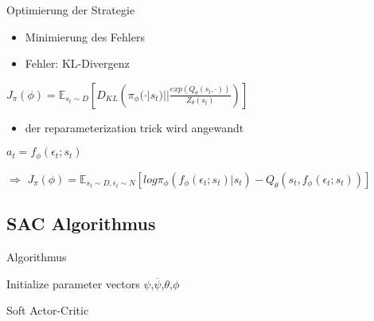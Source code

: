 \begin{frame}{Optimierung der Strategie}
\begin{itemize}
\item Minimierung des Fehlers
\item Fehler: KL-Divergenz
\end{itemize}
$J_{\pi}(\phi)=\mathbb{E}_{s_{t}\sim D}\left[D_{KL}\left(\pi_{\phi}(\cdot | s_{t})||\frac{exp(Q_{\theta}(s_{t},\cdot))}{Z_{\theta}(s_{t})}\right)\right]$
\begin{itemize}
\item der reparameterization trick wird angewandt
\end{itemize}
$a_{t}=f_{\phi}(\epsilon_{t};s_{t})$

$\Rightarrow$
$J_{\pi}(\phi)=\mathbb{E}_{s_{t}\sim D,\epsilon_{t}\sim N}\left[log\pi_{\phi}(f_{\phi}(\epsilon_{t};s_{t})|s_{t})-Q_{\theta}(s_{t},f_{\phi}(\epsilon_{t};s_{t}))\right]$
\end{frame}

\subsection{SAC Algorithmus}

\begin{frame}{Algorithmus}
\begin{algorithm}[H]
{\small
\SetAlgoLined
Initialize parameter vectors $\psi$,$\overline{\psi}$,$\theta$,$\phi$\\
}
 \caption{Soft Actor-Critic}
\end{algorithm}
\end{frame}

















